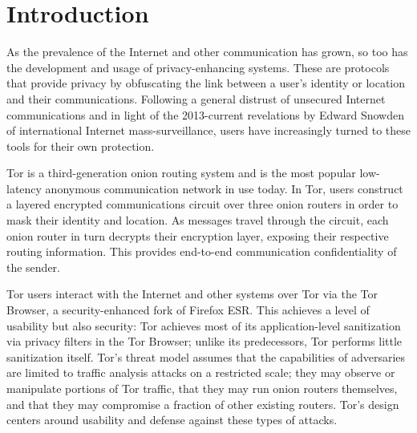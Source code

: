 \documentclass[conference]{IEEEtran}
\begin{document}


%

\section{Introduction}

As the prevalence of the Internet and other communication has grown, so too has the development and usage of privacy-enhancing systems. These are protocols that provide privacy by obfuscating the link between a user's identity or location and their communications. Following a general distrust of unsecured Internet communications and in light of the 2013-current revelations by Edward Snowden of international Internet mass-surveillance, users have increasingly turned to these tools for their own protection.

Tor \cite{dingledine2004tor} is a third-generation onion routing system and is the most popular low-latency anonymous communication network in use today. In Tor, users construct a layered encrypted communications circuit over three onion routers in order to mask their identity and location. As messages travel through the circuit, each onion router in turn decrypts their encryption layer, exposing their respective routing information. This provides end-to-end communication confidentiality of the sender.

\newpage

Tor users interact with the Internet and other systems over Tor via the Tor Browser, a security-enhanced fork of Firefox ESR. This achieves a level of usability but also security: Tor achieves most of its application-level sanitization via privacy filters in the Tor Browser; unlike its predecessors, Tor performs little sanitization itself. Tor's threat model assumes that the capabilities of adversaries are limited to traffic analysis attacks on a restricted scale; they may observe or manipulate portions of Tor traffic, that they may run onion routers themselves, and that they may compromise a fraction of other existing routers. Tor's design centers around usability and defense against these types of attacks.
\end{document}
